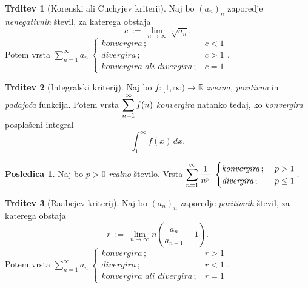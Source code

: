 \documentclass[11pt]{article}
\newcommand{\R}{\mathbb{R}}
\theoremstyle{definition}
\theoremstyle{definition}
\newtheorem{trditev}{Trditev}[section]
\theoremstyle{definition}
\theoremstyle{theorem}
\newtheorem*{posledica}{Posledica}
\begin{document}
\begin{trditev}[Korenski ali Cuchyjev kriterij]

Naj bo $(a_n)_n$ zaporedje \textit{nenegativnih} števil, za katerega obstaja
$$c ~:=~ \lim_{n \rightarrow \infty} \sqrt[n]{a_n}.$$
Potem vrsta $\sum_{n=1}^\infty a_n ~ \begin{cases}
\textit{konvergira}\,; ~&c<1\\
\textit{divergira}\,; ~&c>1 \\
\textit{konvergira ali divergira}\,; ~&c=1
\end{cases}.$ 

\end{trditev}
\vspace{0.5cm}

\begin{trditev}[Integralski kriterij]

Naj bo $f: [1, \infty) \rightarrow \R$ \textit{zvezna, pozitivna} in \textit{padajoča} funkcija. Potem vrsta $\mathlarger{\sum_{n=1}^\infty f(n)}$ \textit{konvergira} natanko tedaj, ko \textit{konvergira} posplošeni integral
$$\int_1^\infty f(x)\,dx.$$

\end{trditev}
\vspace{0.5cm}

\begin{posledica}

Naj bo $p>0$ \textit{realno} število. Vrsta $\mathlarger{\sum_{n=1}^\infty \frac{1}{n^p}} ~ \begin{cases}
\textit{konvergira}\,; ~&p>1 \\
\textit{divergira}\,; ~&p \leq 1
\end{cases}.$

\end{posledica}
\vspace{0.5cm}

\begin{trditev}[Raabejev kriterij]

Naj bo $(a_n)_n$ zaporedje \textit{pozitivnih} števil, za katerega obstaja
$$r ~:=~ \lim_{n \rightarrow \infty} n \left( \frac{a_n}{a_{n+1}} - 1 \right).$$
Potem vrsta $\sum_{n=1}^\infty a_n ~ \begin{cases}
\textit{konvergira}\,; ~&r>1 \\
\textit{divergira}\,; ~&r<1 \\
\textit{konvergira ali divergira}\,; ~&r=1
\end{cases}.$

\end{trditev}
\vspace{0.5cm}
\end{document}
